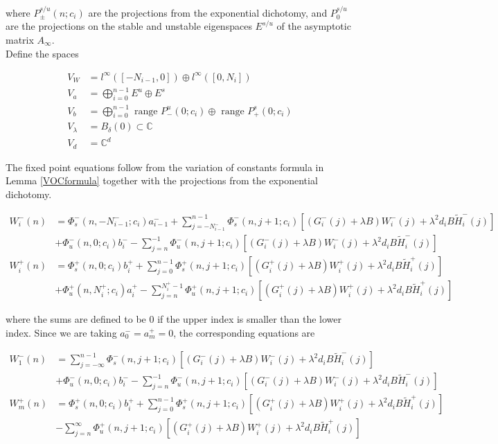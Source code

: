 \documentclass[12pt]{article}
\def\C{{\mathbb C}}
\begin{document}
where $P_\pm^{s/u}(n; c_i)$ are the projections from the exponential dichotomy, and $P_0^{s/u}$ are the projections on the stable and unstable eigenspaces $E^{s/u}$ of the asymptotic matrix $A_\infty$.\\

Define the spaces

\begin{align*}
V_W &= l^\infty([-N_{i-1}, 0]) \oplus l^\infty([0, N_i])  \\
V_a &= \bigoplus_{i=0}^{n-1} E^u \oplus E^s \\
V_b &= \bigoplus_{i=0}^{n-1} 
\text{ range } P_-^u(0; c_i) \oplus \text{ range } P_+^s(0; c_i)\\
V_\lambda &= B_\delta(0) \subset \C \\
V_d &= \C^d
\end{align*}

The fixed point equations follow from the variation of constants formula in Lemma \ref{VOCformula} together with the projections from the exponential dichotomy.

\begin{align*}
W_i^-(n) &= 
\Phi_s^-(n, -N_{i-1}^-; c_i) a_{i-1}^- + \sum_{j = -N_{i-1}^-}^{n-1} \Phi_s^-(n, j+1; c_i)
[(G_i^-(j) + \lambda B) W_i^-(j) + \lambda^2 d_i B \tilde{H}_i^-(j)]
 \\
&+ \Phi_u^-(n, 0; c_i) b_i^- - \sum_{j = n}^{-1} \Phi_u^-(n, j+1; c_i) 
[(G_i^-(j) + \lambda B) W_i^-(j) + \lambda^2 d_i B \tilde{H}_i^-(j)] \\
W_i^+(n) &= \Phi_s^+(n, 0; c_i) b_i^+ + \sum_{j = 0}^{n-1} \Phi_s^+(n, j+1; c_i) 
[(G_i^+(j) + \lambda B) W_i^+(j) + \lambda^2 d_i B \tilde{H}_i^+(j)] \\
&+ \Phi_u^+(n, N_i^+; c_i) a_i^+ - \sum_{j = n}^{N_i^+-1} \Phi_u^+(n, j+1; c_i) 
[(G_i^+(j) + \lambda B) W_i^+(j) + \lambda^2 d_i B \tilde{H}_i^+(j)]
\end{align*}

where the sums are defined to be $0$ if the upper index is smaller than the lower index. Since we are taking $a_0^- = a_m^+ = 0$, the corresponding equations are

\begin{align*}
W_1^-(n) &= \sum_{j = -\infty}^{n-1} \Phi_s^-(n, j+1; c_i)
[(G_i^-(j) + \lambda B) W_i^-(j) + \lambda^2 d_i B \tilde{H}_i^-(j)]
 \\
&+ \Phi_u^-(n, 0; c_i) b_i^- - \sum_{j = n}^{-1} \Phi_u^-(n, j+1; c_i) 
[(G_i^-(j) + \lambda B) W_i^-(j) + \lambda^2 d_i B \tilde{H}_i^-(j)] \\
W_m^+(n) &= \Phi_s^+(n, 0; c_i) b_i^+ + \sum_{j = 0}^{n-1} \Phi_s^+(n, j+1; c_i) 
[(G_i^+(j) + \lambda B) W_i^+(j) + \lambda^2 d_i B \tilde{H}_i^+(j)] \\
&- \sum_{j = n}^{\infty} \Phi_u^+(n, j+1; c_i) 
[(G_i^+(j) + \lambda B) W_i^+(j) + \lambda^2 d_i B \tilde{H}_i^+(j)]
\end{align*}
\end{document}
